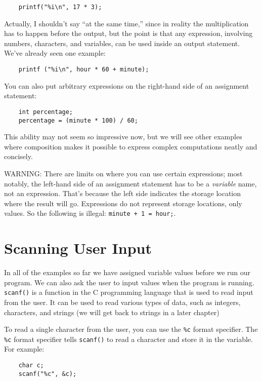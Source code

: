 \begin{verbatim}
    printf("%i\n", 17 * 3);
\end{verbatim}
%
Actually, I shouldn't say ``at the same time,'' since in reality
the multiplication has to happen before the output, but
the point is that any expression, involving numbers, characters,
and variables, can be used inside an output statement.  We've
already seen one example:

\begin{verbatim}
    printf ("%i\n", hour * 60 + minute);
\end{verbatim}
%
You can also put arbitrary expressions on the right-hand
side of an assignment statement:

\begin{verbatim}
    int percentage;
    percentage = (minute * 100) / 60;
\end{verbatim}
%
This ability may not seem so impressive now, but we will see
other examples where composition makes it possible
to express complex computations neatly and concisely.

WARNING: There are limits on where you can use certain
expressions; most notably, the left-hand side of an assignment
statement has to be a {\em variable} name, not an expression.
That's because the left side indicates the storage location
where the result will go.  Expressions
do not represent storage locations, only values.  So the
following is illegal:  {\tt minute + 1 = hour;}.


\section{Scanning User Input}
In all of the examples so far we have assigned variable values before we run our program. 
We can also ask the user to input values when the program is running. 
 {\tt scanf()} is a function in the C programming language that is used to read input from the user.
  It can be used to read various types of data, such as integers, characters, and strings (we will get back to strings in a later chapter)
 
To read a single character from the user, you can use the  {\tt \%c} 
format specifier. The {\tt \%c} format specifier tells {\tt scanf()} to read a 
character and store it in the variable. For example:
\begin{verbatim}
    char c;
    scanf("%c", &c);
\end{verbatim}
%

